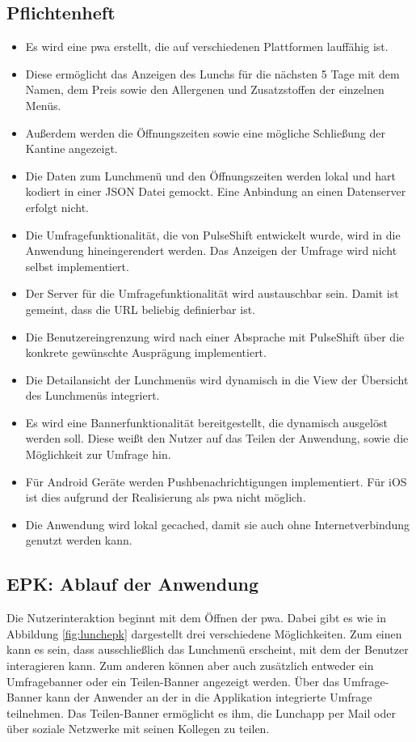 \subsection{Pflichtenheft}

\begin{itemize}
\item Es wird eine \gls{pwa} erstellt, die auf verschiedenen Plattformen lauffähig ist. 
\item Diese ermöglicht das Anzeigen des Lunchs für die nächsten 5 Tage mit dem Namen, dem Preis sowie den Allergenen und Zusatzstoffen der einzelnen Menüs. 
\item Außerdem werden die Öffnungszeiten sowie eine mögliche Schließung der Kantine angezeigt.
\item Die Daten zum Lunchmenü und den Öffnungszeiten werden lokal und hart kodiert in einer JSON Datei gemockt. Eine Anbindung an einen Datenserver erfolgt nicht. 
\item Die Umfragefunktionalität, die von PulseShift entwickelt wurde, wird in die Anwendung hineingerendert werden. Das Anzeigen der Umfrage wird nicht selbst implementiert. 
\item Der Server für die Umfragefunktionalität wird austauschbar sein. Damit ist gemeint, dass die URL beliebig definierbar ist.
\item Die Benutzereingrenzung wird nach einer Absprache mit PulseShift über die konkrete gewünschte Ausprägung implementiert.
\item Die Detailansicht der Lunchmenüs wird dynamisch in die View der Übersicht des Lunchmenüs integriert.
\item Es wird eine Bannerfunktionalität bereitgestellt, die dynamisch ausgelöst werden soll. Diese weißt den Nutzer auf das Teilen der Anwendung, sowie die Möglichkeit zur Umfrage hin.
\item Für Android Geräte werden Pushbenachrichtigungen implementiert. Für iOS ist dies aufgrund der Realisierung als \gls{pwa} nicht möglich.
\item Die Anwendung wird lokal gecached, damit sie auch ohne Internetverbindung genutzt werden kann.
\end{itemize}

\subsection{EPK: Ablauf der Anwendung}

Die Nutzerinteraktion beginnt mit dem Öffnen der \gls{pwa}. Dabei gibt es wie in Abbildung \ref{fig:lunchepk} dargestellt drei verschiedene Möglichkeiten. Zum einen kann es sein, dass ausschließlich das Lunchmenü erscheint, mit dem der Benutzer interagieren kann. Zum anderen können aber auch zusätzlich entweder ein Umfragebanner oder ein Teilen-Banner angezeigt werden. Über das Umfrage-Banner kann der Anwender an der in die Applikation integrierte Umfrage teilnehmen. Das Teilen-Banner ermöglicht es ihm, die Lunchapp per Mail oder über soziale Netzwerke mit seinen Kollegen zu teilen.

